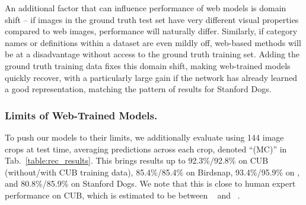 \documentclass[runningheads]{llncs}
\begin{document}
An additional factor that can influence performance of web models is domain shift -- if images in the ground truth test set have very different visual properties compared to web images, performance will naturally differ.
Similarly, if category names or definitions within a dataset are even mildly off, web-based methods will be at a disadvantage without access to the ground truth training set.
Adding the ground truth training data fixes this domain shift, making web-trained models quickly recover, with a particularly large gain if the network has already learned a good representation, matching the pattern of results for Stanford Dogs.



\subsubsection{Limits of Web-Trained Models.}
To push our models to their limits, we additionally evaluate using 144 image crops at test time, averaging predictions across each crop, denoted ``(MC)'' in Tab.~\ref{table:rec_results}.
This brings results up to 92.3\%/92.8\% on CUB (without/with CUB training data), 85.4\%/85.4\% on Birdsnap, 93.4\%/95.9\% on \fgvc{}, and 80.8\%/85.9\% on Stanford Dogs.
We note that this is close to human expert performance on CUB, which is estimated to be between ~\cite{branson2014ignorant} and ~\cite{horn2015}.
\end{document}
